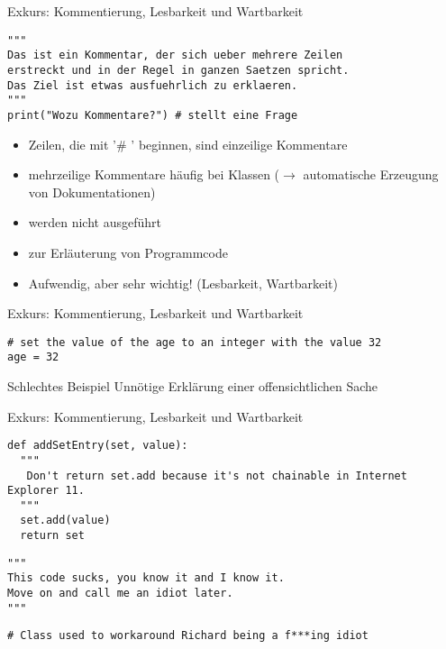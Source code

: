 \begin{frame}[fragile]{Exkurs: Kommentierung, Lesbarkeit und Wartbarkeit}
    \begin{lstlisting}
"""
Das ist ein Kommentar, der sich ueber mehrere Zeilen
erstreckt und in der Regel in ganzen Saetzen spricht.
Das Ziel ist etwas ausfuehrlich zu erklaeren.
"""
print("Wozu Kommentare?") # stellt eine Frage
    \end{lstlisting}
    \begin{itemize}
        \item Zeilen, die mit '\# ' beginnen, sind einzeilige Kommentare
        \item mehrzeilige Kommentare häufig bei Klassen ($\rightarrow$ automatische 
        Erzeugung von Dokumentationen)
        \item werden nicht ausgeführt
        \item zur Erläuterung von Programmcode
        \item Aufwendig, aber sehr wichtig! (Lesbarkeit, Wartbarkeit)
    \end{itemize}
\end{frame}

\begin{frame}[fragile]{Exkurs: Kommentierung, Lesbarkeit und Wartbarkeit}
    \begin{lstlisting}
# set the value of the age to an integer with the value 32
age = 32
    \end{lstlisting}
    \pause{}
    \begin{alertblock}{Schlechtes Beispiel}
    Unnötige Erklärung einer offensichtlichen Sache
    \end{alertblock}
\end{frame}

\begin{frame}[fragile]{Exkurs: Kommentierung, Lesbarkeit und Wartbarkeit}
    \begin{lstlisting}
def addSetEntry(set, value):
  """ 
   Don't return set.add because it's not chainable in Internet Explorer 11.
  """ 
  set.add(value)    
  return set
    \end{lstlisting}
    \pause{}
    \begin{lstlisting}
"""
This code sucks, you know it and I know it.  
Move on and call me an idiot later.
"""
    \end{lstlisting}
    \pause{}
    \begin{lstlisting}
# Class used to workaround Richard being a f***ing idiot
    \end{lstlisting}
\end{frame}

